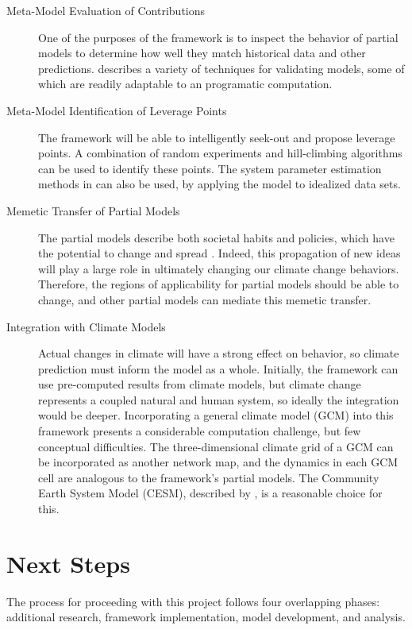 \documentclass[12pt, oneside]{amsart}
\begin{document}
\begin{description}
\item[Meta-Model Evaluation of Contributions] One of the purposes of the framework is to inspect the behavior of partial models to determine how well they match historical data and other predictions.  \citet{barlas1996formal} describes a variety of techniques for validating models, some of which are readily adaptable to an programatic computation.

\item[Meta-Model Identification of Leverage Points] The framework will be able to intelligently seek-out and propose leverage points.  A combination of random experiments and hill-climbing algorithms can be used to identify these points.  The system parameter estimation methods in \citet{graham1976parameter} can also be used, by applying the model to idealized data sets.

\item[Memetic Transfer of Partial Models] The partial models describe both societal habits and policies, which have the potential to change and spread \citep{pech2004memetic}.  Indeed, this propagation of new ideas will play a large role in ultimately changing our climate change behaviors.  Therefore, the regions of applicability for partial models should be able to change, and other partial models can mediate this memetic transfer.

\item[Integration with Climate Models] Actual changes in climate will have a strong effect on behavior, so climate prediction must inform the model as a whole.  Initially, the framework can use pre-computed results from climate models, but climate change represents a coupled natural and human system, so ideally the integration would be deeper.  Incorporating a general climate model (GCM) into this framework presents a considerable computation challenge, but few conceptual difficulties.  The three-dimensional climate grid of a GCM can be incorporated as another network map, and the dynamics in each GCM cell are analogous to the framework's partial models.  The Community Earth System Model (CESM), described by \citet{blackmon2003towards}, is a reasonable choice for this.
\end{description}

\section{Next Steps}
\label{sec:implementing}

The process for proceeding with this project follows four overlapping phases: additional research, framework implementation, model development, and analysis.
\end{document}
